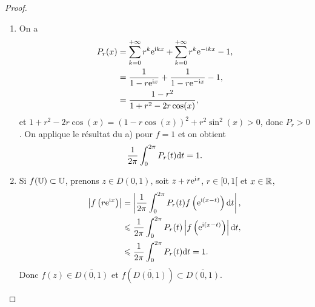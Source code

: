 \documentclass[12pt]{article}
\begin{document}
\begin{proof}
\begin{enumerate}
        \item On a 
        \begin{align}
            P_r(x)
            &=\sum_{k=0}^{+\infty}r^{k}\mathrm{e}^{\mathrm{i} kx}+\sum_{k=0}^{+\infty}r^{k}\mathrm{e}^{-\mathrm{i} kx}-1,\\
            &=\frac{1}{1-r\mathrm{e}^{\mathrm{i} x}}+\frac{1}{1-r\mathrm{e}^{-\mathrm{i} x}}-1,\\
            &=\frac{1-r^{2}}{1+r^{2}-2r\cos(x)},
        \end{align}
        et $1+r^{2}-2r\cos(x)=\left(1-r\cos(x)\right)^{2}+r^{2}\sin^{2}(x)>0$, donc $P_r>0$. On applique le résultat du a) pour $f=1$ et on obtient 
        \begin{equation}
            \frac{1}{2\pi}\int_{0}^{2\pi}P_r(t)\mathrm{d} t=1.
        \end{equation}

        \item Si $f(\mathbb{U})\subset\mathbb{U}$, prenons $z\in D(0,1)$, soit $z+r\mathrm{e}^{\mathrm{i} x}$, $r\in[0,1[$ et $x\in\mathbb{R}$,
        \begin{align}
            \left\lvert f\left(r\mathrm{e}^{\mathrm{i} x}\right)\right\rvert 
            &= \left\lvert \frac{1}{2\pi}\int_{0}^{2\pi}P_r(t)f\left(\mathrm{e}^{\mathrm{i}(x-t)}\right)\mathrm{d} t\right\rvert,\\
            &\leqslant\frac{1}{2\pi}\int_{0}^{2\pi}P_r(t)\left\lvert f\left(\mathrm{e}^{\mathrm{i}(x-t)}\right)\right\rvert\mathrm{d} t,\\
            &\leqslant\frac{1}{2\pi}\int_{0}^{2\pi}P_r(t)\mathrm{d} t=1.
        \end{align}
        Donc $f(z)\in\overline{D(0,1)}$ et $f\left(\overline{D(0,1)}\right)\subset\overline{D(0,1)}$.
    \end{enumerate}
\end{proof}
\end{document}
